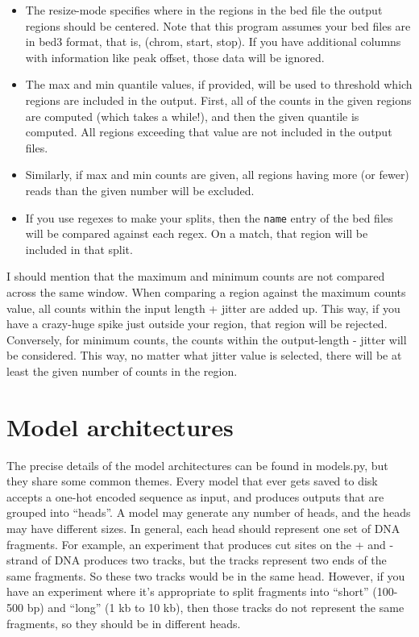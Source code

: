 \documentclass{article}
\begin{document}
\begin{itemize}
    \item The resize-mode specifies where in the regions in the bed file the output regions should be centered. Note that this program assumes your bed files are in bed3 format, that is, (chrom, start, stop). If you have additional columns with information like peak offset, those data will be ignored. 
    \item The max and min quantile values, if provided, will be used to threshold which regions are included in the output. First, all of the counts in the given regions are computed (which takes a while!), and then the given quantile is computed. All regions exceeding that value are not included in the output files. 
    \item Similarly, if max and min counts are given, all regions having more (or fewer) reads than the given number will be excluded. 
    \item If you use regexes to make your splits, then the \texttt{name} entry of the bed files will be compared against each regex. On a match, that region will be included in that split. 
\end{itemize}

I should mention that the maximum and minimum counts are not compared across the same window. 
When comparing a region against the maximum counts value, all counts within the input length + jitter are added up. This way, if you have a crazy-huge spike just outside your region, that region will be rejected. 
Conversely, for minimum counts, the counts within the output-length - jitter will be considered. This way, no matter what jitter value is selected, there will be at least the given number of counts in the region. 

\section{Model architectures}\label{sec:modelArchitectures}

The precise details of the model architectures can be found in models.py, but they share some common themes. 
Every model that ever gets saved to disk accepts a one-hot encoded sequence as input, and produces outputs that are grouped into ``heads''. 
A model may generate any number of heads, and the heads may have different sizes. 
In general, each head should represent one set of DNA fragments. For example, an experiment that produces cut sites on the + and - strand of DNA produces
two tracks, but the tracks represent two ends of the same fragments. So these two tracks would be in the same head. 
However, if you have an experiment where it's appropriate to split fragments into ``short'' (100-500 bp) and ``long'' (1 kb to 10 kb), then 
those tracks do not represent the same fragments, so they should be in different heads. 
\end{document}
